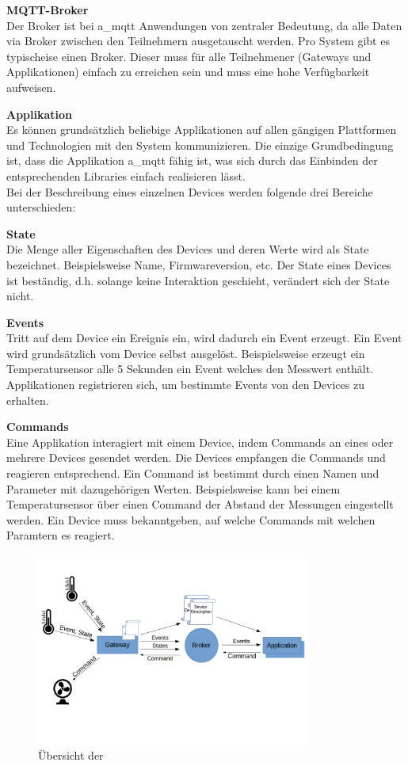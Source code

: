 \textbf{MQTT-Broker} \\
Der Broker ist bei \acrshort{a_mqtt} Anwendungen von zentraler Bedeutung, da alle Daten via Broker zwischen den Teilnehmern ausgetauscht werden. Pro System gibt es typischeise einen Broker. Dieser muss für alle Teilnehmener (Gateways und Applikationen) einfach zu erreichen sein und muss eine hohe Verfügbarkeit aufweisen.

\textbf{Applikation} \\
Es können grundsätzlich beliebige Applikationen auf allen gängigen Plattformen und Technologien mit den System kommunizieren. Die einzige Grundbedingung ist, dass die Applikation \acrshort{a_mqtt} fähig ist, was sich durch das Einbinden der entsprechenden Libraries einfach realisieren lässt.
\\


Bei der Beschreibung eines einzelnen Devices werden folgende drei Bereiche unterschieden:

\textbf{State} \\
Die Menge aller Eigenschaften des Devices und deren Werte wird als State bezeichnet. Beispielsweise Name, Firmwareversion, etc. Der State eines Devices ist beständig, d.h. solange keine Interaktion geschieht, verändert sich der State nicht.


\textbf{Events} \\
Tritt auf dem Device ein Ereignis ein, wird dadurch ein Event erzeugt. Ein Event wird grundsätzlich vom Device selbst ausgelöst. Beispielsweise erzeugt ein Temperatursensor alle 5 Sekunden ein Event welches den Messwert enthält. Applikationen registrieren sich, um bestimmte Events von den Devices zu erhalten.


\textbf{Commands} \\
Eine Applikation interagiert mit einem Device, indem Commands an eines oder mehrere Devices gesendet werden. Die Devices empfangen die Commands und reagieren entsprechend. Ein Command ist bestimmt durch einen Namen und Parameter mit dazugehörigen Werten. 
Beispielsweise kann bei einem Temperatursensor über einen Command  der Abstand der Messungen eingestellt werden.
Ein Device muss bekanntgeben, auf welche Commands mit welchen Paramtern es reagiert.


\begin{figure}[H]
	\centering
		\includegraphics[width=0.8\textwidth]{diag/Overview.png}
	\caption{\label{fig:overview}Übersicht der}
\end{figure}


